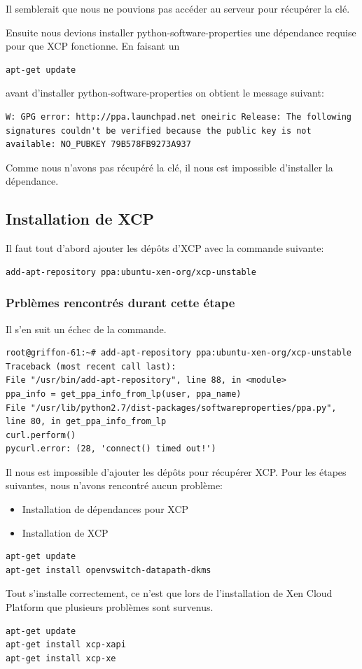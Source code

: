 Il semblerait que nous ne pouvions pas accéder au serveur pour récupérer la clé.

Ensuite nous devions installer python-software-properties une dépendance requise pour que XCP fonctionne.
En faisant un
\begin{lstlisting} 
apt-get update
\end{lstlisting}
avant d'installer python-software-properties on obtient le message suivant:

\begin{lstlisting}
W: GPG error: http://ppa.launchpad.net oneiric Release: The following signatures couldn't be verified because the public key is not available: NO_PUBKEY 79B578FB9273A937
\end{lstlisting}

Comme nous n'avons pas récupéré la clé, il nous est impossible d'installer la dépendance.

\subsection{Installation de XCP}

Il faut tout d'abord ajouter les dépôts d'XCP avec la commande suivante:
\begin{lstlisting}
add-apt-repository ppa:ubuntu-xen-org/xcp-unstable
\end{lstlisting}

\subsubsection{Prblèmes rencontrés durant cette étape}
Il s'en suit un échec de la commande.
\begin{lstlisting}  
root@griffon-61:~# add-apt-repository ppa:ubuntu-xen-org/xcp-unstable
Traceback (most recent call last):
File "/usr/bin/add-apt-repository", line 88, in <module>
ppa_info = get_ppa_info_from_lp(user, ppa_name)
File "/usr/lib/python2.7/dist-packages/softwareproperties/ppa.py", line 80, in get_ppa_info_from_lp
curl.perform()
pycurl.error: (28, 'connect() timed out!')
\end{lstlisting}
Il nous est impossible d'ajouter les dépôts pour récupérer XCP.
Pour les étapes suivantes, nous n'avons rencontré aucun problème:
\begin{itemize}
\item Installation de dépendances pour XCP
\item Installation de XCP
\end{itemize}
\begin{lstlisting}
apt-get update
apt-get install openvswitch-datapath-dkms
\end{lstlisting}
Tout s'installe correctement, ce n'est que lors de l'installation de Xen Cloud Platform que plusieurs problèmes sont survenus.
\begin{lstlisting}
apt-get update
apt-get install xcp-xapi
apt-get install xcp-xe
\end{lstlisting}


